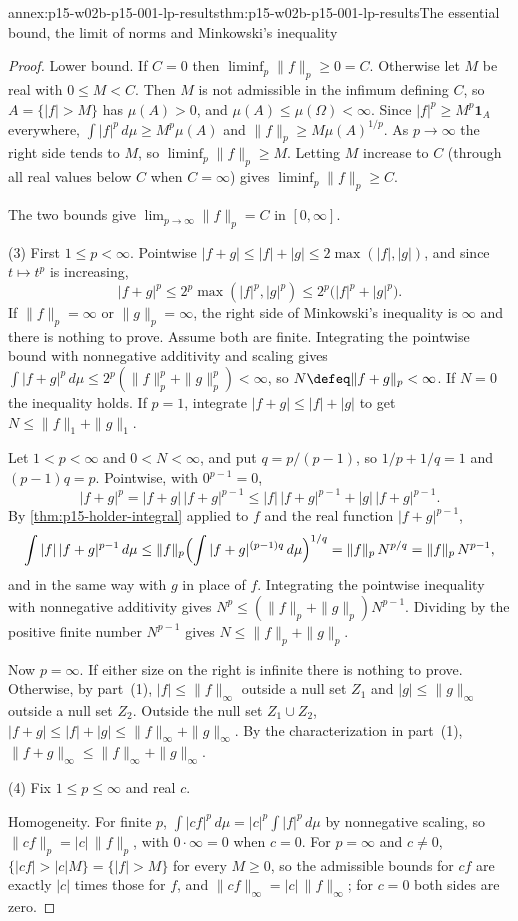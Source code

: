 \begin{annexitem}{annex:p15-w02b-p15-001-lp-results}{thm:p15-w02b-p15-001-lp-results}{The essential bound, the limit of norms and Minkowski's inequality}
\begin{proof}
Lower bound. If \(C=0\) then \(\liminf_p\|f\|_p\geq0=C\). Otherwise let
\(M\) be real with \(0\leq M<C\). Then \(M\) is not admissible in the
infimum defining \(C\), so \(A=\{|f|>M\}\) has \(\mu(A)>0\), and
\(\mu(A)\leq\mu(\Omega)<\infty\). Since \(|f|^p\geq M^p\mathbf1_A\)
everywhere, \(\int|f|^p\,d\mu\geq M^p\mu(A)\) and
\(\|f\|_p\geq M\mu(A)^{1/p}\). As \(p\to\infty\) the right side tends
to \(M\), so \(\liminf_p\|f\|_p\geq M\). Letting \(M\) increase to
\(C\) (through all real values below \(C\) when \(C=\infty\)) gives
\(\liminf_p\|f\|_p\geq C\).

The two bounds give \(\lim_{p\to\infty}\|f\|_p=C\) in \([0,\infty]\).

(3) First \(1\leq p<\infty\). Pointwise
\(|f+g|\leq|f|+|g|\leq2\max(|f|,|g|)\), and since \(t\mapsto t^p\) is
increasing,
\[
 |f+g|^p\leq2^p\max(|f|^p,|g|^p)\leq2^p\bigl(|f|^p+|g|^p\bigr).
\]
If \(\|f\|_p=\infty\) or \(\|g\|_p=\infty\), the right side of
Minkowski's inequality is \(\infty\) and there is nothing to prove.
Assume both are finite. Integrating the pointwise bound with
nonnegative additivity and scaling gives
\(\int|f+g|^p\,d\mu\leq2^p(\|f\|_p^p+\|g\|_p^p)<\infty\), so
\(N\defeq\|f+g\|_p<\infty\). If \(N=0\) the inequality holds. If
\(p=1\), integrate \(|f+g|\leq|f|+|g|\) to get \(N\leq\|f\|_1+\|g\|_1\).

Let \(1<p<\infty\) and \(0<N<\infty\), and put \(q=p/(p-1)\), so
\(1/p+1/q=1\) and \((p-1)q=p\). Pointwise, with \(0^{p-1}=0\),
\[
 |f+g|^p=|f+g|\,|f+g|^{p-1}\leq|f|\,|f+g|^{p-1}+|g|\,|f+g|^{p-1}.
\]
By \cref{thm:p15-holder-integral} applied to \(f\) and the real function
\(|f+g|^{p-1}\),
\[
 \int|f|\,|f+g|^{p-1}\,d\mu\leq\|f\|_p
 \Bigl(\int|f+g|^{(p-1)q}\,d\mu\Bigr)^{1/q}
 =\|f\|_p\,N^{p/q}=\|f\|_p\,N^{p-1},
\]
and in the same way with \(g\) in place of \(f\). Integrating the
pointwise inequality with nonnegative additivity gives
\(N^p\leq(\|f\|_p+\|g\|_p)N^{p-1}\). Dividing by the positive finite
number \(N^{p-1}\) gives \(N\leq\|f\|_p+\|g\|_p\).

Now \(p=\infty\). If either size on the right is infinite there is
nothing to prove. Otherwise, by part~(1), \(|f|\leq\|f\|_\infty\)
outside a null set \(Z_1\) and \(|g|\leq\|g\|_\infty\) outside a null set
\(Z_2\). Outside the null set \(Z_1\cup Z_2\),
\(|f+g|\leq|f|+|g|\leq\|f\|_\infty+\|g\|_\infty\). By the
characterization in part~(1),
\(\|f+g\|_\infty\leq\|f\|_\infty+\|g\|_\infty\).

(4) Fix \(1\leq p\leq\infty\) and real \(c\).

Homogeneity. For finite \(p\),
\(\int|cf|^p\,d\mu=|c|^p\int|f|^p\,d\mu\) by nonnegative scaling, so
\(\|cf\|_p=|c|\,\|f\|_p\), with \(0\cdot\infty=0\) when \(c=0\). For
\(p=\infty\) and \(c\neq0\), \(\{|cf|>|c|M\}=\{|f|>M\}\) for every
\(M\geq0\), so the admissible bounds for \(cf\) are exactly \(|c|\)
times those for \(f\), and \(\|cf\|_\infty=|c|\,\|f\|_\infty\); for
\(c=0\) both sides are zero.


\end{proof}
\end{annexitem}
